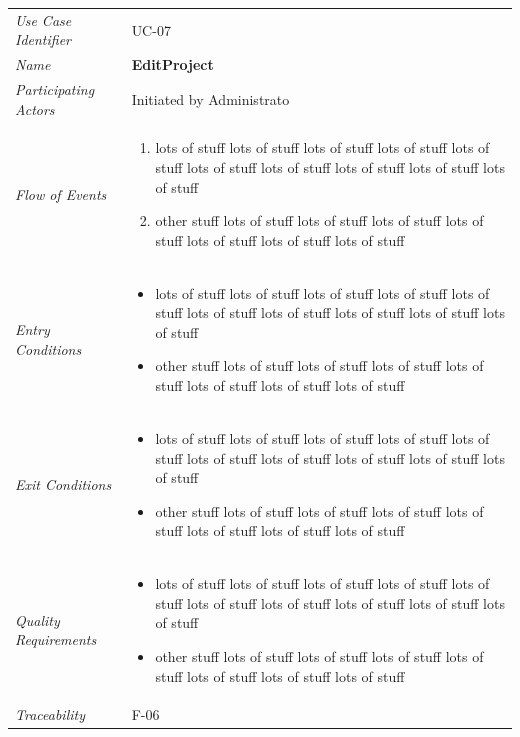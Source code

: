 \documentclass[12pt,letterpaper]{article}
\begin{document}
\begin{center}
	\begin{tabu} to 
		\toprule
		Use Case Identifier & UC-07 \\
		Name & {\bf EditProject} \\
		Participating Actors & Initiated by Administrato \\
		Flow of Events & 
	    \begin{enumerate}[topsep=-1em]
		    \item lots of stuff lots of stuff lots of stuff lots of stuff lots of stuff lots of stuff lots of stuff lots of stuff lots of stuff lots of stuff
		    \item other stuff lots of stuff lots of stuff lots of stuff lots of stuff lots of stuff lots of stuff lots of stuff
		\end{enumerate} \\

		Entry Conditions &
		\begin{itemize}[topsep=-1em]
		    \item lots of stuff lots of stuff lots of stuff lots of stuff lots of stuff lots of stuff lots of stuff lots of stuff lots of stuff lots of stuff
		    \item other stuff lots of stuff lots of stuff lots of stuff lots of stuff lots of stuff lots of stuff lots of stuff
        \end{itemize} \\

		Exit Conditions &
		\begin{itemize}[topsep=-1em]
		    \item lots of stuff lots of stuff lots of stuff lots of stuff lots of stuff lots of stuff lots of stuff lots of stuff lots of stuff lots of stuff
		    \item other stuff lots of stuff lots of stuff lots of stuff lots of stuff lots of stuff lots of stuff lots of stuff
        \end{itemize} \\

		Quality Requirements &
		\begin{itemize}[topsep=-1em]
		    \item lots of stuff lots of stuff lots of stuff lots of stuff lots of stuff lots of stuff lots of stuff lots of stuff lots of stuff lots of stuff
		    \item other stuff lots of stuff lots of stuff lots of stuff lots of stuff lots of stuff lots of stuff lots of stuff
        \end{itemize} \\

		Traceability & F-06 \\
		\toprule
	\end{tabu}
\end{center}
\end{document}
